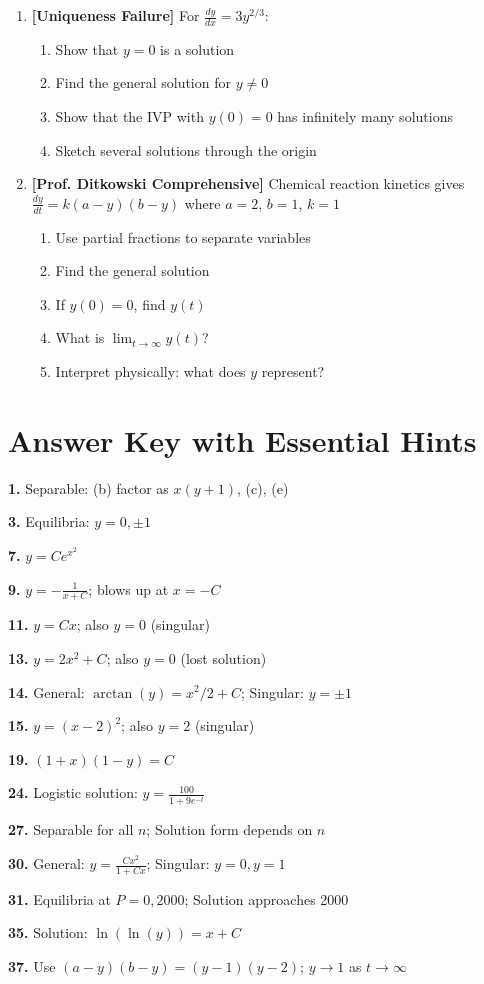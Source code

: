 \documentclass[12pt]{article}
\begin{document}
\begin{enumerate}[resume]
\item \textbf{[Uniqueness Failure]} For $\frac{dy}{dx} = 3y^{2/3}$:
    \begin{enumerate}
        \item Show that $y = 0$ is a solution
        \item Find the general solution for $y \neq 0$
        \item Show that the IVP with $y(0) = 0$ has infinitely many solutions
        \item Sketch several solutions through the origin
    \end{enumerate}

\item \textbf{[Prof. Ditkowski Comprehensive]}
    Chemical reaction kinetics gives $\frac{dy}{dt} = k(a-y)(b-y)$ where $a = 2$, $b = 1$, $k = 1$
    \begin{enumerate}
        \item Use partial fractions to separate variables
        \item Find the general solution
        \item If $y(0) = 0$, find $y(t)$
        \item What is $\lim_{t \to \infty} y(t)$?
        \item Interpret physically: what does $y$ represent?
    \end{enumerate}
\end{enumerate}

\section*{Answer Key with Essential Hints}

\textbf{1.} Separable: (b) factor as $x(y+1)$, (c), (e)

\textbf{3.} Equilibria: $y = 0, \pm 1$

\textbf{7.} $y = Ce^{x^2}$

\textbf{9.} $y = -\frac{1}{x+C}$; blows up at $x = -C$

\textbf{11.} $y = Cx$; also $y = 0$ (singular)

\textbf{13.} $y = 2x^2 + C$; also $y = 0$ (lost solution)

\textbf{14.} General: $\arctan(y) = x^2/2 + C$; Singular: $y = \pm 1$

\textbf{15.} $y = (x-2)^2$; also $y = 2$ (singular)

\textbf{19.} $(1+x)(1-y) = C$

\textbf{24.} Logistic solution: $y = \frac{100}{1 + 9e^{-t}}$

\textbf{27.} Separable for all $n$; Solution form depends on $n$

\textbf{30.} General: $y = \frac{Cx^2}{1+Cx}$; Singular: $y = 0, y = 1$

\textbf{31.} Equilibria at $P = 0, 2000$; Solution approaches 2000

\textbf{35.} Solution: $\ln(\ln(y)) = x + C$

\textbf{37.} Use $(a-y)(b-y) = (y-1)(y-2)$; $y \to 1$ as $t \to \infty$
\end{document}
